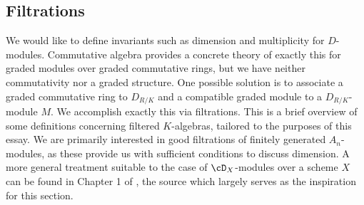 \subsection{Filtrations}

We would like to define invariants such as dimension and multiplicity for $D$-modules. Commutative algebra provides a concrete theory of exactly this for graded modules over graded commutative rings, but we have neither commutativity nor a graded structure. One possible solution is to associate a graded commutative ring to $D_{R/K}$ and a compatible graded module to a $D_{R/K}$-module $M$. We accomplish exactly this via filtrations. This is a brief overview of some definitions concerning filtered $K$-algebras, tailored to the purposes of this essay. We are primarily interested in good filtrations of finitely generated $A_n$-modules, as these provide us with sufficient conditions to discuss dimension. A more general treatment suitable to the case of $\cD_X$-modules over a scheme $X$ can be found in Chapter 1 of \cite{ginzburg_d-mod}, the source which largely serves as the inspiration for this section.

